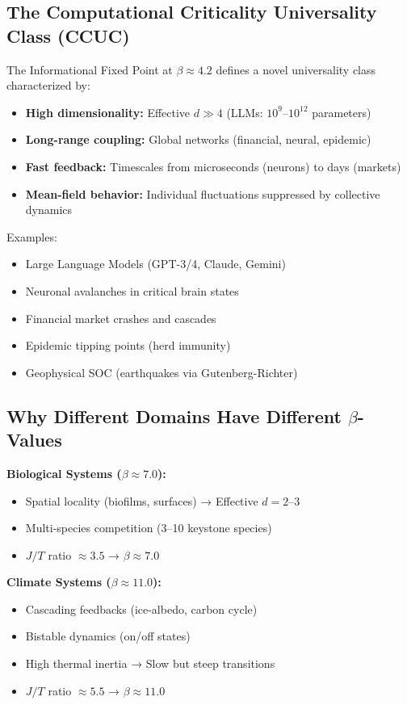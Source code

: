 \documentclass[11pt,a4paper]{article}
\begin{document}
\subsection{The Computational Criticality Universality Class (CCUC)}

The Informational Fixed Point at $\beta \approx 4.2$ defines a novel universality class characterized by:

\begin{itemize}
\item \textbf{High dimensionality:} Effective $d \gg 4$ (LLMs: $10^9$--$10^{12}$ parameters)
\item \textbf{Long-range coupling:} Global networks (financial, neural, epidemic)
\item \textbf{Fast feedback:} Timescales from microseconds (neurons) to days (markets)
\item \textbf{Mean-field behavior:} Individual fluctuations suppressed by collective dynamics
\end{itemize}

Examples:
\begin{itemize}
\item Large Language Models (GPT-3/4, Claude, Gemini)
\item Neuronal avalanches in critical brain states
\item Financial market crashes and cascades
\item Epidemic tipping points (herd immunity)
\item Geophysical SOC (earthquakes via Gutenberg-Richter)
\end{itemize}

\subsection{Why Different Domains Have Different $\beta$-Values}

\textbf{Biological Systems ($\beta \approx 7.0$):}
\begin{itemize}
\item Spatial locality (biofilms, surfaces) → Effective $d = 2$--3
\item Multi-species competition (3--10 keystone species)
\item $J/T$ ratio $\approx 3.5$ → $\beta \approx 7.0$
\end{itemize}

\textbf{Climate Systems ($\beta \approx 11.0$):}
\begin{itemize}
\item Cascading feedbacks (ice-albedo, carbon cycle)
\item Bistable dynamics (on/off states)
\item High thermal inertia → Slow but steep transitions
\item $J/T$ ratio $\approx 5.5$ → $\beta \approx 11.0$
\end{itemize}
\end{document}
